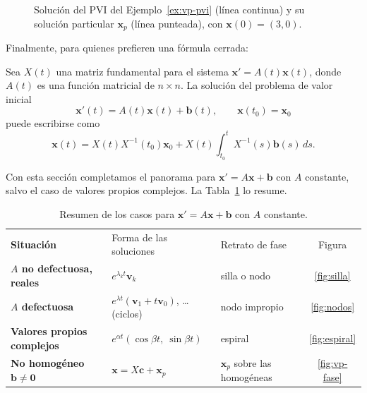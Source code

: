 \begin{figure}[H]
\centering
{}
\caption{Soluci\'on del PVI del Ejemplo~\ref{ex:vp-pvi} (l\'inea continua) y su soluci\'on particular $\mathbf x_p$ (l\'inea punteada), con $\mathbf x(0)=(3,0)$.}
\label{fig:vp-pvi}
\end{figure}

Finalmente, para quienes prefieren una f\'ormula cerrada:

\begin{theorem}\label{thm:formula}
Sea $X(t)$ una matriz fundamental para el sistema $\mathbf{x}' = A(t)\mathbf{x}(t)$, donde $A(t)$ es una funci\'on matricial de $n \times n$. La soluci\'on del problema de valor inicial
\[
\mathbf{x}'(t) = A(t)\mathbf{x}(t) + \mathbf{b}(t), \qquad \mathbf{x}(t_0) = \mathbf{x}_0
\]
puede escribirse como
\[
\mathbf{x}(t) = X(t)X^{-1}(t_0)\mathbf{x}_0 + X(t)\int_{t_0}^t X^{-1}(s)\mathbf{b}(s) \, ds.
\]
\end{theorem}

Con esta secci\'on completamos el panorama para $\mathbf x'=A\mathbf x+\mathbf b$ con $A$ constante, salvo el caso de valores propios complejos. La Tabla~\ref{tab:mapa} lo resume.

\begin{table}[H]
\centering
\renewcommand{\arraystretch}{1.4}
\begin{tabular}{>{\bfseries}l l l c}
\rowcolor{bbe!15}
\textcolor{bbe}{Situaci\'on} & \textcolor{bbe}{Forma de las soluciones} & \textcolor{bbe}{Retrato de fase} & \textcolor{bbe}{Figura}\\
$A$ no defectuosa, reales & $e^{\lambda_k t}\mathbf v_k$ & silla o nodo & \ref{fig:silla} \\
$A$ defectuosa & $e^{\lambda t}(\mathbf v_1+t\mathbf v_0)$, \dots (ciclos) & nodo impropio & \ref{fig:nodos} \\
Valores propios complejos & $e^{\alpha t}(\cos\beta t,\ \sin\beta t)$ & espiral & \ref{fig:espiral} \\
No homog\'eneo $\mathbf b\neq\mathbf 0$ & $\mathbf x=X\mathbf c+\mathbf x_p$ & $\mathbf x_p$ sobre las homog\'eneas & \ref{fig:vp-fase} \\
\end{tabular}
\caption{Resumen de los casos para $\mathbf x'=A\mathbf x+\mathbf b$ con $A$ constante.}
\label{tab:mapa}
\end{table}